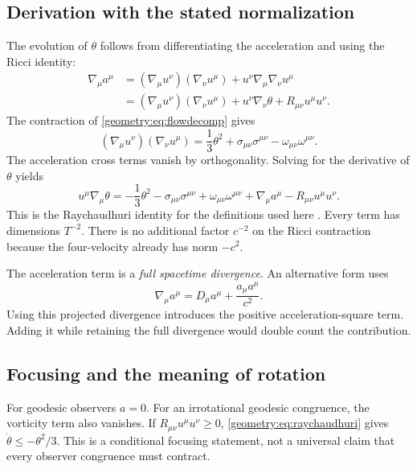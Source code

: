 \documentclass[11pt,oneside]{report}
\theoremstyle{remark}
\numberwithin{definition}{chapter}
\numberwithin{proposition}{chapter}
\numberwithin{remark}{chapter}
\begin{document}
\subsection{Derivation with the stated normalization}
The evolution of $\theta$ follows from differentiating the acceleration and using the Ricci identity:
\begin{align}
\nabla_\mu a^\mu
&=(\nabla_\mu u^\nu)(\nabla_\nu u^\mu)
+u^\nu\nabla_\mu\nabla_\nu u^\mu\\
&=(\nabla_\mu u^\nu)(\nabla_\nu u^\mu)
+u^\nu\nabla_\nu\theta+R_{\mu\nu}u^\mu u^\nu.
\end{align}
The contraction of \eqref{geometry:eq:flowdecomp} gives
\begin{equation}
(\nabla_\mu u^\nu)(\nabla_\nu u^\mu)
=\frac13\theta^2+\sigma_{\mu\nu}\sigma^{\mu\nu}
-\omega_{\mu\nu}\omega^{\mu\nu}.
\end{equation}
The acceleration cross terms vanish by orthogonality. Solving for the derivative of $\theta$ yields
\begin{equation}
\boxed{u^\mu\nabla_\mu\theta=-\frac13\theta^2
-\sigma_{\mu\nu}\sigma^{\mu\nu}+\omega_{\mu\nu}\omega^{\mu\nu}
+\nabla_\mu a^\mu-R_{\mu\nu}u^\mu u^\nu.}
\label{geometry:eq:raychaudhuri}
\end{equation}
This is the Raychaudhuri identity for the definitions used here \parencite{Raychaudhuri1955,EllisVanElst1999}. Every term has dimensions $T^{-2}$. There is no additional factor $c^{-2}$ on the Ricci contraction because the four-velocity already has norm $-c^2$.

The acceleration term is a \emph{full spacetime divergence}. An alternative form uses
\begin{equation}
\nabla_\mu a^\mu=D_\mu a^\mu+\frac{a_\mu a^\mu}{c^2}.
\end{equation}
Using this projected divergence introduces the positive acceleration-square term. Adding it while retaining the full divergence would double count the contribution.

\subsection{Focusing and the meaning of rotation}
For geodesic observers $a=0$. For an irrotational geodesic congruence, the vorticity term also vanishes. If $R_{\mu\nu}u^\mu u^\nu\geq0$, \eqref{geometry:eq:raychaudhuri} gives $\dot\theta\leq-\theta^2/3$. This is a conditional focusing statement, not a universal claim that every observer congruence must contract.
\end{document}
